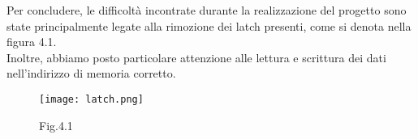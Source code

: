 \documentclass[12pt, table, xcdraw]{article}
\begin{document}
Per concludere, le difficoltà incontrate durante la realizzazione del progetto sono state principalmente legate alla rimozione dei latch presenti, come si denota nella figura 4.1.\\ Inoltre, abbiamo posto particolare attenzione alle lettura e scrittura dei dati nell'indirizzo di memoria corretto.
\begin{figure}[h!]
\begin{center}
  \texttt{[image: latch.png]}
\caption*{Fig.4.1}
\end{center}
\end{figure}
\FloatBarrier
\end{document}
